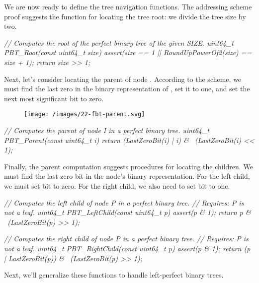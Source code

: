 \documentclass{article}
\begin{document}
We are now ready to define the tree navigation functions.
The addressing scheme proof suggests the function for locating the tree root: we divide the tree size by two.

\begin{code}[c]
\em{// Computes the root of the perfect binary tree of the given SIZE.}
uint64_t PBT_Root(const uint64_t size) {
    assert(size == 1 || RoundUpPowerOf2(size) == size + 1);
    return size >> 1;
}
\end{code}

Next, let's consider locating the parent of node .
According to the scheme, we must find the last zero in the binary representation of , set it to one, and set the next most significant bit to zero.

\begin{figure}[grayscale-diagram,medium-size]
  \texttt{[image: /images/22-fbt-parent.svg]}
\end{figure}

\begin{code}[c]
\em{// Computes the parent of node I in a perfect binary tree.}
uint64_t PBT_Parent(const uint64_t i) {
    return (LastZeroBit(i) | i) & ~(LastZeroBit(i) << 1);
}
\end{code}

Finally, the parent computation suggests procedures for locating the children.
We must find the last zero bit  in the node's binary representation.
For the left child, we must set bit  to zero.
For the right child, we also need to set bit  to one.

\begin{code}[c]
\em{// Computes the left child of node P in a perfect binary tree.}
\em{// Requires: P is not a leaf.}
uint64_t PBT_LeftChild(const uint64_t p) {
    assert(p & 1);
    return p & ~(LastZeroBit(p) >> 1);
}

\em{// Computes the right child of node P in a perfect binary tree.}
\em{// Requires: P is not a leaf.}
uint64_t PBT_RightChild(const uint64_t p) {
    assert(p & 1);
    return (p | LastZeroBit(p)) & ~(LastZeroBit(p) >> 1);
}
\end{code}

Next, we'll generalize these functions to handle left-perfect binary trees.
\end{document}

